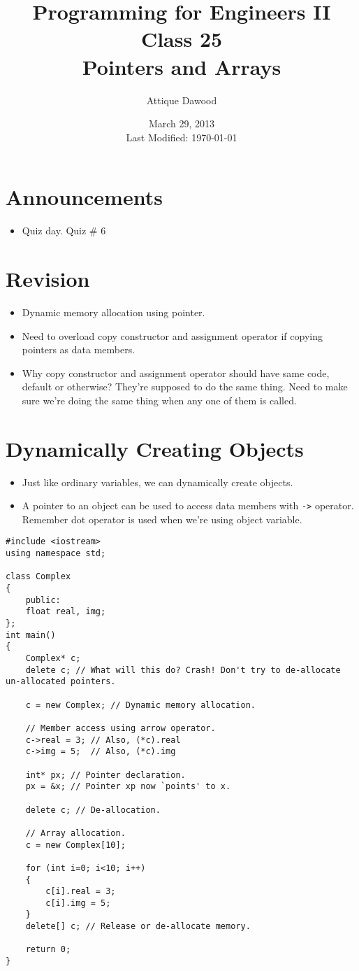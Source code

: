 \documentclass[12pt,a4paper]{article}
\title{\vspace{-2cm}Programming for Engineers II\\Class 25\\Pointers and Arrays}
\author{Attique Dawood}
\date{March 29, 2013\\[0.2cm] Last Modified: \today}
\begin{document}
\maketitle
\section{Announcements}
\begin{itemize}
\item Quiz day. Quiz \# 6
\end{itemize}
\section{Revision}
\begin{itemize}
\item Dynamic memory allocation using pointer.
\item Need to overload copy constructor and assignment operator if copying pointers as data members.
\item Why copy constructor and assignment operator should have same code, default or otherwise? They're supposed to do the same thing. Need to make sure we're doing the same thing when any one of them is called.
\end{itemize}
\section{Dynamically Creating Objects}
\begin{itemize}
\item Just like ordinary variables, we can dynamically create objects.
\item A pointer to an object can be used to access data members with \verb|->| operator. Remember dot operator is used when we're using object variable.
\end{itemize}
\begin{lstlisting}[caption={Pointers to Objects}]
#include <iostream>
using namespace std;

class Complex
{
	public:
	float real, img;
};
int main()
{
	Complex* c;
	delete c; // What will this do? Crash! Don't try to de-allocate un-allocated pointers.

	c = new Complex; // Dynamic memory allocation.

	// Member access using arrow operator.
	c->real = 3; // Also, (*c).real
	c->img = 5;  // Also, (*c).img

	int* px; // Pointer declaration.
	px = &x; // Pointer xp now `points' to x.

	delete c; // De-allocation.

	// Array allocation.
	c = new Complex[10];

	for (int i=0; i<10; i++)
	{
		c[i].real = 3;
		c[i].img = 5;
	}
	delete[] c; // Release or de-allocate memory.

	return 0;
}
\end{lstlisting}
\end{document}
